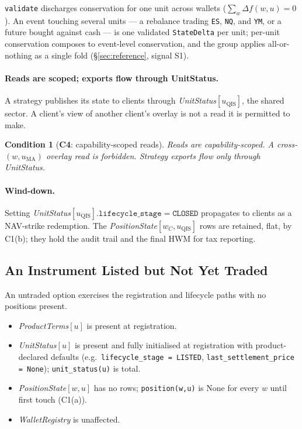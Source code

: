 \documentclass[11pt,a4paper]{article}
\newtheorem{condition}[definition]{Condition}
\begin{document}
\noindent \texttt{validate} discharges conservation for one unit across wallets
($\sum_{w}\Delta f(w,u)=0$). An event touching several units --- a rebalance trading
\texttt{ES}, \texttt{NQ}, and \texttt{YM}, or a future bought against cash --- is one
validated \texttt{StateDelta} per unit; per-unit conservation composes to event-level
conservation, and the group applies all-or-nothing as a single fold
(\S\ref{sec:reference}, signal S1).

\paragraph{Reads are scoped; exports flow through UnitStatus.}
A strategy publishes its state to clients through \emph{UnitStatus}$[u_{\mathrm{QIS}}]$, the
shared sector. A client's view of another client's overlay is not a read it is permitted to
make.

\begin{condition}[\textbf{C4}: capability-scoped reads]
Reads are capability-scoped. A cross-$(w,u_{\mathrm{MA}})$ overlay read is forbidden.
Strategy exports flow only through \emph{UnitStatus}.
\end{condition}

\paragraph{Wind-down.}
Setting \emph{UnitStatus}$[u_{\mathrm{QIS}}].\texttt{lifecycle\_stage}=\texttt{CLOSED}$
propagates to clients as a NAV-strike redemption. The
\emph{PositionState}$[w_C,u_{\mathrm{QIS}}]$ rows are retained, flat, by C1(b); they hold the
audit trail and the final HWM for tax reporting.

\subsection{An Instrument Listed but Not Yet Traded}
\label{sec:untraded}

An untraded option exercises the registration and lifecycle paths with no positions present.

\begin{itemize}[leftmargin=*]
\item \emph{ProductTerms}$[u]$ is present at registration.
\item \emph{UnitStatus}$[u]$ is present and fully initialised at registration with
product-declared defaults (e.g.\ \texttt{lifecycle\_stage = LISTED},
\texttt{last\_settlement\_price = None}); \texttt{unit\_status(u)} is total.
\item \emph{PositionState}$[w,u]$ has no rows; \texttt{position(w,u)} is $\mathrm{None}$ for
every $w$ until first touch (C1(a)).
\item \emph{WalletRegistry} is unaffected.
\end{itemize}
\end{document}
